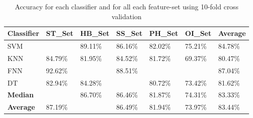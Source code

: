 \documentclass[journal,article,submit,moreauthors,pdftex]{Definitions/mdpi}
\begin{document}
\begin{table}[H]
	\caption{Accuracy for each classifier and for all each feature-set using 10-fold cross validation }
	\centering
	\begin{tabular}{p{2cm}p{1.7cm}p{1.7cm}p{1.7cm}p{1.7cm}p{1.7cm}p{1.7cm}}
		\toprule
		\textbf{Classifier} & \textbf{ST\_Set} & \textbf{HB\_Set} & \textbf{SS\_Set} & \textbf{PH\_Set} & \textbf{OI\_Set} & Average \\
		\midrule
		SVM &  \cellcolor{gray!35}{93.41\%} & 89.11\% & 86.16\% &82.02\% & 75.21\% &84.78\%\\
		KNN & 84.79\% & 81.95\% & 84.52\% &81.72\% & 69.37\%& 80.47\% \\
		FNN & 92.62\% & \cellcolor{gray!35}{95.89\%} & 88.51\% &\cellcolor{gray!35}{83.31\%} & \cellcolor{gray!35}{77.88\%} & 87.04\%\\
		DT & 82.94\% & 84.28\% &  \cellcolor{gray!35}{86.76\%} &80.72\% & 73.42\% &81.62\%\\
		\bottomrule
		\textbf{Median} & \cellcolor{gray!35}{87.20\%} &  86.70\% &86.46\% & 81.87\% & 74.31\%&83.33\%\\
		\midrule
		\textbf{Average} & 87.19\% &  \cellcolor{gray!35}{87.80\%}  & 86.49\% &81.94\% & 73.97\% &83.44\%\\
		\bottomrule
	\end{tabular}
	\label{accuracy_classifier_featureset}
\end{table}
\end{document}

